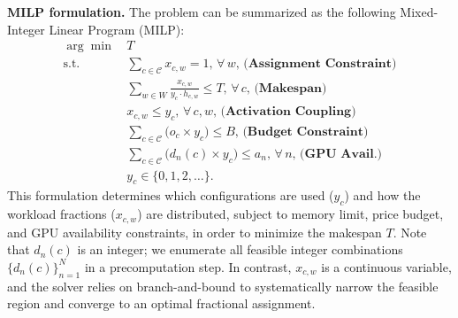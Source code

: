 \textbf{MILP formulation.} The problem can be summarized as the following Mixed-Integer Linear Program (MILP):
{\footnotesize %
\setlength{\jot}{2pt} %
\begin{align}
\arg\min \,
& T \\[2pt]
\text{s.t.} \quad 
& \sum\nolimits_{c \in \mathcal{C}} x_{c,w} = 1, \, \forall\, w,\,\textbf{(Assignment Constraint)} \label{eq:const1}\\
& \sum\nolimits_{w \in W} \frac{x_{c,w}}{y_c \cdot h_{c,w}} \le T, \, \forall\, c,\,\textbf{(Makespan)} \label{eq:const2}\\
& x_{c,w} \le y_c, \,\forall\, c, w, \,\textbf{(Activation Coupling)} \label{eq:const3} \\
& \sum\nolimits_{c \in \mathcal{C}} \bigl(o_c \times y_c\bigr) \le B,\,\textbf{(Budget Constraint)} \label{eq:const4}\\
& \sum\nolimits_{c \in \mathcal{C}} \bigl(d_{n}(c)\times y_c\bigr) \le a_{n}, \,\forall\, n, \label{eq:const5} \,\textbf{(GPU Avail.)} \\
& y_c \in \{0,1,2,\dots\}.
\end{align}
}
This formulation determines which configurations are used ($y_c$) and how the workload fractions ($x_{c,w}$) are distributed, subject to memory limit, price budget, and GPU availability constraints, in order to minimize the makespan $T$. Note that $d_n(c)$ is an integer; we enumerate all feasible integer combinations $\{d_n(c)\}_{n=1}^{N}$ in a precomputation step. In contrast, $x_{c,w}$ is a continuous variable, and the solver relies on branch-and-bound to systematically narrow the feasible region and converge to an optimal fractional assignment.


